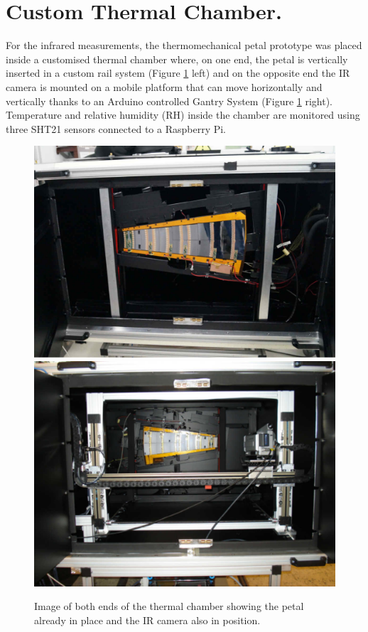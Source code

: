 	\section{Custom Thermal Chamber. }\label{section2.2}
	
		For the infrared measurements, the thermomechanical petal prototype was placed inside a customised thermal chamber where, on one end, the petal is vertically inserted in a custom rail system (Figure \ref{fig2.3} left) and on the opposite end the IR camera is mounted on a mobile platform that can move horizontally and vertically thanks to an Arduino controlled Gantry System (Figure \ref{fig2.3} right). Temperature and relative humidity (RH) inside the chamber are monitored using three SHT21 sensors connected  to a Raspberry Pi. 
		
		\begin{figure}[ht!]
			\centering
			\captionsetup{justification=centering,margin=2cm}
			\includegraphics[scale=0.25]{Figures/Chapter02/ChamberBack.jpg}
			\includegraphics[scale=0.26]{Figures/Chapter02/CamberFront.jpg}
			\caption{Image of both ends of the thermal chamber showing the petal already in place and the IR camera also in position.}\label{fig2.3}
		\end{figure}
		
